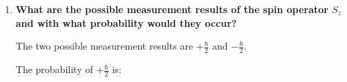 \documentclass[11pt]{article}
\makeatletter
\DeclarePairedDelimiter\abs{\lvert}{\rvert}
\let\oldabs\abs
\def\abs{\@ifstar{\oldabs}{\oldabs*}}
\makeatother
\begin{document}
\begin{enumerate}[label=\textbf{\arabic*.}]
{\begin{enumerate}[label=\textbf{(\alph*)}]
{\begin{align*}
                        &=\abs{\tfrac{4+3i}{5\sqrt 2}\cdot\tfrac{1}{\sqrt 2}(\bra{+}+i\bra{-})\ket{+}-\tfrac{3+4i}{5\sqrt 2}\cdot\tfrac{1}{\sqrt 2}(\bra{+}+i\bra{-})\ket{-}}^2 \\
                        &=\abs{\frac{4+3i}{5\cdot 2}-\frac{3+4i}{5\cdot 2}i}^2 \\
                        &=\abs{\frac{4+3i}{5\cdot 2}-\frac{-4+3i}{5\cdot 2}}^2 \\
                        &=\abs{\frac{8}{10}}^2 \\
                        &=\frac{16}{25}
                    \end{align*}
                    The probability of \(-\frac \hbar 2\) is:
                    \begin{align*}
                        \abs{\prescript{}{y}{\braket{-|\psi}}}^2&=\abs{\prescript{}{y}{\bra{+}}\cdot\tfrac{1}{5\sqrt 2}((4+3i)\ket{+}-(3+4i)\ket{-})}^2 \\
                        &=\abs{\tfrac{4+3i}{5\sqrt 2}\prescript{}{y}{\braket{-|+}}-\tfrac{3+4i}{5\sqrt 2}\prescript{}{y}{\braket{-|-}}}^2
                    \end{align*}
                    From class, \(\ket{-}_y=\frac{1}{\sqrt 2}(\ket{+}-i\ket{-})\):
                    \begin{align*}
                        &=\abs{\tfrac{4+3i}{5\sqrt 2}\cdot\tfrac{1}{\sqrt 2}(\bra{+}-i\bra{-})\ket{+}-\tfrac{3+4i}{5\sqrt 2}\cdot\tfrac{1}{\sqrt 2}(\bra{+}-i\bra{-})\ket{-}}^2 \\
                        &=\abs{\frac{4+3i}{5\cdot 2}+\frac{3+4i}{5\cdot 2}i}^2 \\
                        &=\abs{\frac{4+3i}{5\cdot 2}+\frac{-4+3i}{5\cdot 2}}^2 \\
                        &=\abs{\frac{6i}{10}}^2 \\
                        &=\frac{36}{100} \\
                        &=\frac{9}{25}
                    \end{align*}
                }
                \item{
                    \textbf{\boldmath What are the possible measurement results of the spin operator \(S_z\) and with what probability would they occur?}
                    \par
                    The two possible measurement results are \(+\frac \hbar 2\) and \(-\frac \hbar 2\).
                    \par
                    The probability of \(+\frac \hbar 2\) is:
}
\end{enumerate}}
\end{enumerate}
\end{document}
